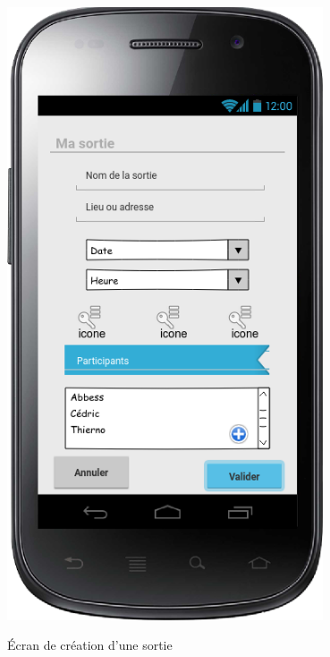 \documentclass[a4paper, 12pt, notitlepage]{article} %
\begin{document}
\begin{maquetteFig}[!htb]
  \centering
  \includegraphics[width=0.7\textwidth]{creation_soires.png}
  \caption{Écran de création d'une sortie}
  \label{Maquette:CreerSoiree}
\end{maquetteFig}
\end{document}
